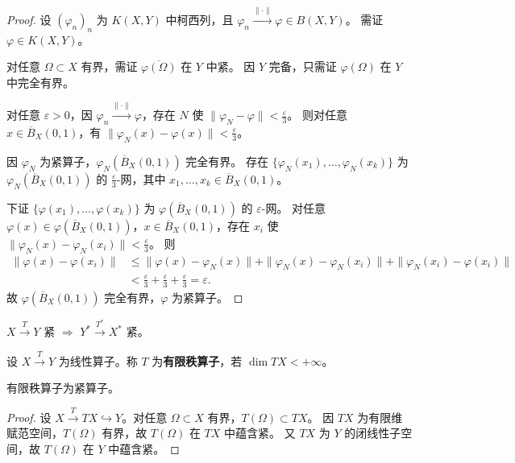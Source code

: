 \documentclass[lang=cn,a4paper,newtx,section]{elegantbook}
\begin{document}
\begin{proof}
  设 $(\varphi_n)_n$ 为 $K(X,Y)$ 中柯西列，且 $\varphi_n\xrightarrow{\|\cdot\|}\varphi\in B(X,Y)$。
  需证 $\varphi\in K(X,Y)$。
  
  对任意 $\Omega\subset X$ 有界，需证 $\overline{\varphi(\Omega)}$ 在 $Y$ 中紧。
  因 $Y$ 完备，只需证 $\varphi(\Omega)$ 在 $Y$ 中完全有界。
  
  对任意 $\varepsilon>0$，因 $\varphi_n\xrightarrow{\|\cdot\|}\varphi$，存在 $N$ 使 $\|\varphi_N-\varphi\|<\frac{\varepsilon}{3}$。
  则对任意 $x\in\overline{B}_X(0,1)$，有 $\|\varphi_N(x)-\varphi(x)\|<\frac{\varepsilon}{3}$。
  
  因 $\varphi_N$ 为紧算子，$\varphi_N(\overline{B}_X(0,1))$ 完全有界。
  存在 $\{\varphi_N(x_1),\ldots,\varphi_N(x_k)\}$ 为 $\varphi_N(\overline{B}_X(0,1))$ 的 $\frac{\varepsilon}{3}$-网，其中 $x_1,\ldots,x_k\in\overline{B}_X(0,1)$。
  
  下证 $\{\varphi(x_1),\ldots,\varphi(x_k)\}$ 为 $\varphi(\overline{B}_X(0,1))$ 的 $\varepsilon$-网。
  对任意 $\varphi(x)\in\varphi(\overline{B}_X(0,1))$，$x\in\overline{B}_X(0,1)$，存在 $x_i$ 使 $\|\varphi_N(x)-\varphi_N(x_i)\|<\frac{\varepsilon}{3}$。
  则
  \begin{align*}
    \|\varphi(x)-\varphi(x_i)\| &\le \|\varphi(x)-\varphi_N(x)\|+\|\varphi_N(x)-\varphi_N(x_i)\|+\|\varphi_N(x_i)-\varphi(x_i)\| \\
    &< \frac{\varepsilon}{3}+\frac{\varepsilon}{3}+\frac{\varepsilon}{3}=\varepsilon.
  \end{align*}
  故 $\varphi(\overline{B}_X(0,1))$ 完全有界，$\varphi$ 为紧算子。
\end{proof}

\begin{theorem}
  $X\xrightarrow{T}Y$ 紧 $\Longrightarrow$ $Y^*\xrightarrow{T^*}X^*$ 紧。
\end{theorem}

\begin{definition}[有限秩算子]
  设 $X\xrightarrow{T}Y$ 为线性算子。称 $T$ 为\textbf{有限秩算子}，若 $\dim TX<+\infty$。
\end{definition}

\begin{proposition}
  有限秩算子为紧算子。
\end{proposition}

\begin{proof}
  设 $X\xrightarrow{T}TX\hookrightarrow Y$。对任意 $\Omega\subset X$ 有界，$T(\Omega)\subset TX$。
  因 $TX$ 为有限维赋范空间，$T(\Omega)$ 有界，故 $T(\Omega)$ 在 $TX$ 中蕴含紧。
  又 $TX$ 为 $Y$ 的闭线性子空间，故 $T(\Omega)$ 在 $Y$ 中蕴含紧。
\end{proof}
\end{document}
